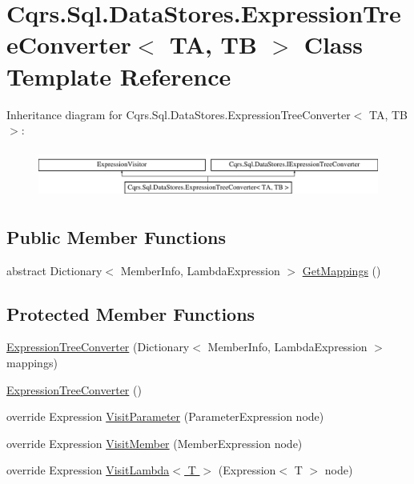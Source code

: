 \hypertarget{classCqrs_1_1Sql_1_1DataStores_1_1ExpressionTreeConverter}{}\section{Cqrs.\+Sql.\+Data\+Stores.\+Expression\+Tree\+Converter$<$ TA, TB $>$ Class Template Reference}
\label{classCqrs_1_1Sql_1_1DataStores_1_1ExpressionTreeConverter}
Inheritance diagram for Cqrs.\+Sql.\+Data\+Stores.\+Expression\+Tree\+Converter$<$ TA, TB $>$\+:\begin{figure}[H]
\begin{center}
\leavevmode
\includegraphics[height=1.618497cm]{classCqrs_1_1Sql_1_1DataStores_1_1ExpressionTreeConverter}
\end{center}
\end{figure}
\subsection*{Public Member Functions}
\begin{DoxyCompactItemize}
\item 
abstract Dictionary$<$ Member\+Info, Lambda\+Expression $>$ \hyperlink{classCqrs_1_1Sql_1_1DataStores_1_1ExpressionTreeConverter_abd0d906a5b8abd8520874104d3bfcad0}{Get\+Mappings} ()
\end{DoxyCompactItemize}
\subsection*{Protected Member Functions}
\begin{DoxyCompactItemize}
\item 
\hyperlink{classCqrs_1_1Sql_1_1DataStores_1_1ExpressionTreeConverter_a6c0d0c72deab71e40aa9e1526fd82593}{Expression\+Tree\+Converter} (Dictionary$<$ Member\+Info, Lambda\+Expression $>$ mappings)
\item 
\hyperlink{classCqrs_1_1Sql_1_1DataStores_1_1ExpressionTreeConverter_a817ef7144b04df19798d7c5c718818b7}{Expression\+Tree\+Converter} ()
\item 
override Expression \hyperlink{classCqrs_1_1Sql_1_1DataStores_1_1ExpressionTreeConverter_a88eef3bef4d4ad3caab1cd2cc033873b}{Visit\+Parameter} (Parameter\+Expression node)
\item 
override Expression \hyperlink{classCqrs_1_1Sql_1_1DataStores_1_1ExpressionTreeConverter_ab6eca1d967e864aee4697f64ea9b23a0}{Visit\+Member} (Member\+Expression node)
\item 
override Expression \hyperlink{classCqrs_1_1Sql_1_1DataStores_1_1ExpressionTreeConverter_abf97079f29447cd8e0bcfab91891ccb9}{Visit\+Lambda$<$ T $>$} (Expression$<$ T $>$ node)
\end{DoxyCompactItemize}


